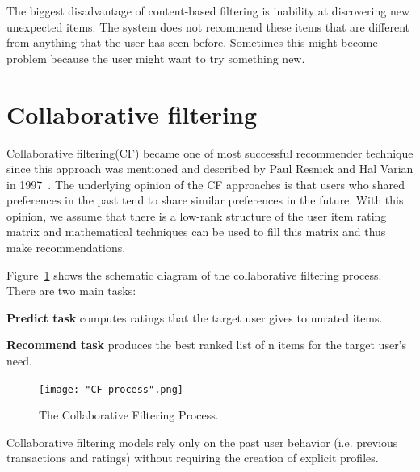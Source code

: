 \documentclass[oneside,13pt]{extreport}
\begin{document}
The biggest disadvantage of content-based filtering is inability at discovering new unexpected items. The system does not recommend these items that are different from anything that the user has seen before. Sometimes this might become problem
because the user might want to try something new.


\section{Collaborative filtering}
Collaborative filtering(CF) became one of most successful recommender technique since this approach was mentioned and described by Paul Resnick and Hal Varian in 1997~\cite{Resnick}. The underlying opinion of the CF approaches is that users who shared preferences in the past tend to share similar preferences in the future. With this opinion,
we assume that there is a low-rank structure of the user item rating
matrix and mathematical techniques can be used to fill this matrix
and thus make recommendations.
 
Figure~\ref{fig:CF process} shows the schematic diagram of the collaborative filtering process. There are two main tasks:
\begin{description}
    \item{\textbf{Predict task}} computes ratings that the target user gives to unrated items. 
    \item{\textbf{Recommend task}} produces the best ranked list of n items for the target user’s need.
\end{description}
\clearpage
\begin{figure}[h!]
    \centering
    \texttt{[image: "CF process".png]} 
    \caption{The Collaborative Filtering Process.}
    \label{fig:CF process}
\end{figure}
    
Collaborative filtering models rely only on the past user behavior (i.e. previous transactions and ratings) without requiring the creation of explicit profiles. 
\end{document}
